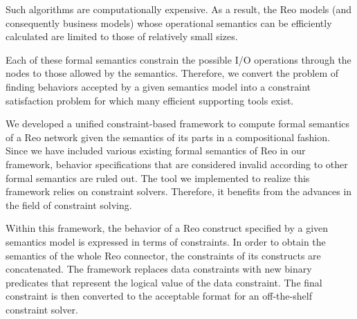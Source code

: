 Such algorithms are computationally expensive. As a result, the Reo models (and consequently business models) whose operational semantics can be efficiently calculated are limited to those of relatively small sizes. 

Each of these formal semantics constrain the possible I/O operations through the nodes to those allowed by the semantics. Therefore, we convert the problem of finding behaviors accepted by a given semantics model into a constraint satisfaction problem for which many efficient supporting tools exist.

%
%

We developed a unified constraint-based framework to compute formal semantics of a Reo network given the semantics of  its parts in a compositional fashion. Since we have included various existing formal semantics of Reo  in our framework, behavior specifications that are considered invalid according to other formal semantics are ruled out. The  tool we implemented to realize this framework relies on  constraint solvers. Therefore, it benefits from the advances in the field of constraint solving.

Within this framework, the behavior of a Reo construct specified by a given semantics model is expressed in terms of constraints. %
 In order to obtain the semantics of the whole Reo connector, the constraints of its constructs are concatenated. The framework replaces data constraints with new binary predicates that represent the logical value of the data constraint. The final constraint is then converted to the acceptable format for an off-the-shelf constraint solver. 

